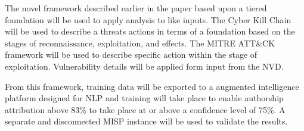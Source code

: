 \documentclass[12pt]{report}
\begin{document}
The novel framework described earlier in the paper based upon a tiered foundation will be used to apply analysis to like inputs.  The Cyber Kill Chain will be used to describe a threats actions in terms of a foundation based on the stages of reconnaissance, exploitation, and effects.  The MITRE ATT\&CK framework will be used to describe specific action within the stage of exploitation.  Vulnerability details will be applied form input from the NVD.

From this framework, training data will be exported to a augmented intelligence platform designed for NLP and training will take place to enable authorship attribution above 83\% to take place at or above a confidence level of 75\%.  A separate and disconnected MISP instance will be used to validate the results.

\end{document}
